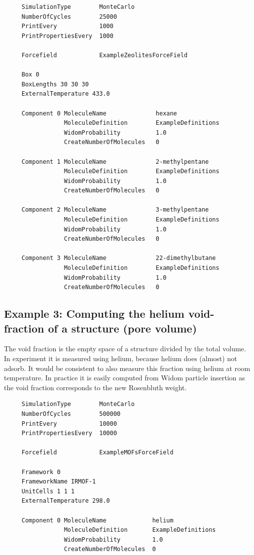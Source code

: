 \begin{tiny}
\begin{verbatim}
     SimulationType        MonteCarlo
     NumberOfCycles        25000
     PrintEvery            1000
     PrintPropertiesEvery  1000
     
     Forcefield            ExampleZeolitesForceField
     
     Box 0
     BoxLengths 30 30 30
     ExternalTemperature 433.0
     
     Component 0 MoleculeName              hexane
                 MoleculeDefinition        ExampleDefinitions
                 WidomProbability          1.0
                 CreateNumberOfMolecules   0
     
     Component 1 MoleculeName              2-methylpentane
                 MoleculeDefinition        ExampleDefinitions
                 WidomProbability          1.0
                 CreateNumberOfMolecules   0
     
     Component 2 MoleculeName              3-methylpentane
                 MoleculeDefinition        ExampleDefinitions
                 WidomProbability          1.0
                 CreateNumberOfMolecules   0
     
     Component 3 MoleculeName              22-dimethylbutane
                 MoleculeDefinition        ExampleDefinitions
                 WidomProbability          1.0
                 CreateNumberOfMolecules   0
\end{verbatim}
\end{tiny}

\subsection*{Example 3: Computing the helium void-fraction of a structure (pore volume)}

The void fraction is the empty space of a structure divided by the total volume. In experiment it
is measured using helium, because helium does (almost) not adsorb. It would be consistent to also
measure this fraction using helium at room temperature. In practice it is easily computed from
Widom particle insertion as the void fraction corresponds to the new Rosenbluth weight.
\begin{tiny}
\begin{verbatim}
     SimulationType        MonteCarlo
     NumberOfCycles        500000
     PrintEvery            10000
     PrintPropertiesEvery  10000
     
     Forcefield            ExampleMOFsForceField
     
     Framework 0
     FrameworkName IRMOF-1
     UnitCells 1 1 1
     ExternalTemperature 298.0
     
     Component 0 MoleculeName             helium
                 MoleculeDefinition       ExampleDefinitions
                 WidomProbability         1.0
                 CreateNumberOfMolecules  0
\end{verbatim}
\end{tiny}

